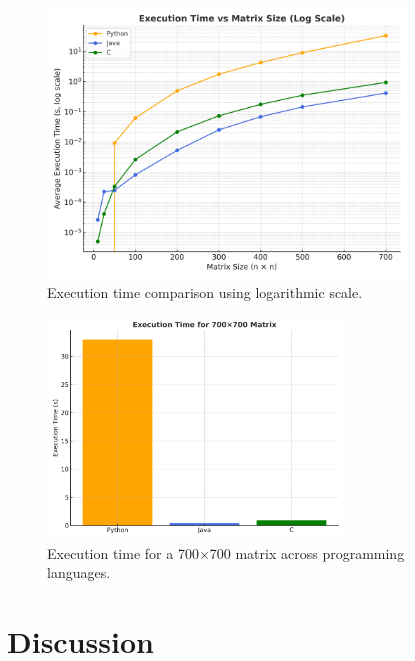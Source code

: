 \documentclass[a4paper,12pt]{article}
\begin{document}
\begin{figure}[H]
    \centering
    \includegraphics[width=0.85\textwidth]{execution_time_log.png}
    \caption{Execution time comparison using logarithmic scale.}
    \label{fig:log}
\end{figure}
\vspace{2cm} %
\begin{figure}[H]
    \centering
    \includegraphics[width=0.7\textwidth]{execution_time_bar.png}
    \caption{Execution time for a 700×700 matrix across programming languages.}
    \label{fig:bar}
\end{figure}

\newpage %

\section*{Discussion}
\end{document}
